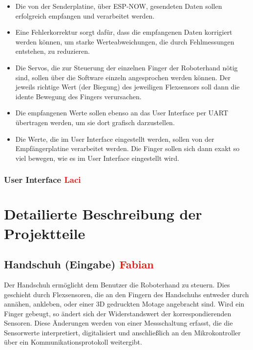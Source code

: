 \documentclass[11pt]{article}
\begin{document}
\begin{itemize}
	\item Die von der Senderplatine, über ESP-NOW, gesendeten Daten sollen erfolgreich empfangen und verarbeitet werden.
	\item Eine Fehlerkorrektur sorgt dafür, dass die empfangenen Daten korrigiert werden können, um starke Werteabweichungen, 
	die durch Fehlmessungen entstehen, zu reduzieren.
	\item Die Servos, die zur Steuerung der einzelnen Finger der Roboterhand nötig sind, sollen über die Software einzeln 
	angesprochen werden können. Der jeweils richtige Wert (der Biegung) des jeweiligen Flexsensors soll dann die idente 
	Bewegung des Fingers verursachen.
	\item Die empfangenen Werte sollen ebenso an das User Interface per UART übertragen werden, um sie dort grafisch 
	darzustellen.
	\item Die Werte, die im User Interface eingestellt werden, sollen von der Empfängerplatine verarbeitet werden. Die Finger 
	sollen sich dann exakt so viel bewegen, wie es im User Interface eingestellt wird.
		
\end{itemize}

\subsubsection{User Interface \textcolor{red}{Laci}}

\hfill \break
\hfill \break


\section{Detailierte Beschreibung der Projektteile}

\subsection{Handschuh (Eingabe) \textcolor{red}{Fabian}}
Der Handschuh ermöglicht dem Benutzer die Roboterhand zu steuern. Dies geschieht durch Flexsensoren, die an den Fingern des 
Handschuhs entweder durch annähen, ankleben, oder einer 3D gedruckten Motage angebracht sind. Wird ein Finger gebeugt, so ändert
sich der Widerstandswert der korrespondierenden Sensoren. Diese Änderungen werden von einer Messschaltung erfasst, die die Sensorwerte
interpretiert, digitalisiert und anschließlich an den Mikrokontroller über ein Kommunikationsprotokoll weitergibt. \\
\end{document}
